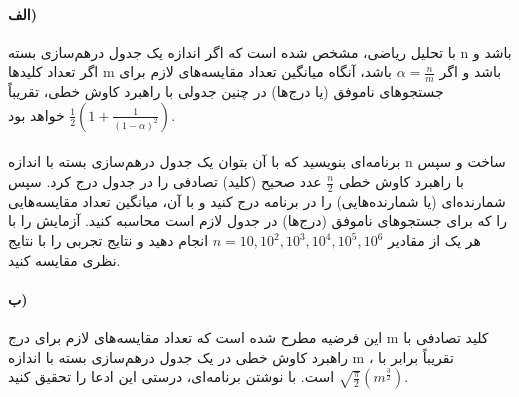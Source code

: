 \documentclass[]{article}
\begin{document}
\paragraph[3.1]{الف)}
با تحلیل ریاضی، مشخص شده است که اگر اندازه یک جدول درهم‌سازی بسته n باشد و اگر تعداد کلیدها m باشد
و اگر $\alpha = \frac{n}{m}$ باشد،
آنگاه میانگین تعداد مقایسه‌های لازم برای جستجوهای ناموفق (یا درج‌ها) در چنین جدولی با راهبرد کاوش خطی، تقریباً
$\displaystyle \frac{1}{2}(1 + \frac{1}{(1-\alpha)^2})$ خواهد بود.

\paragraph[3.2]{}
برنامه‌ای بنویسید که با آن بتوان یک جدول درهم‌سازی بسته با اندازه n ساخت و سپس با راهبرد کاوش خطی
$\frac{n}{2}$ عدد صحیح (کلید) تصادفی را در جدول درج کرد. سپس شمارنده‌ای (یا شمارنده‌هایی) را در برنامه درج کنید
و با آن، میانگین تعداد مقایسه‌هایی را که برای جستجوهای ناموفق (درج‌ها) در جدول لازم است محاسبه کنید.
آزمایش را با هر یک از مقادیر $n = 10, 10^2, 10^3, 10^4, 10^5, 10^6$ انجام دهید و نتایج تجربی را با نتایج نظری مقایسه کنید. 

\paragraph[3.1]{ب)}
این فرضیه مطرح شده است که تعداد مقایسه‌های لازم برای درج m کلید تصادفی با راهبرد کاوش خطی در یک جدول
درهم‌سازی بسته با اندازه m ، تقریباً برابر با
$\displaystyle \sqrt{\frac{\pi}{2}}(m^{\frac{3}{2}})$ است.
با نوشتن برنامه‌ای، درستی این ادعا را تحقیق کنید.
\end{document}
